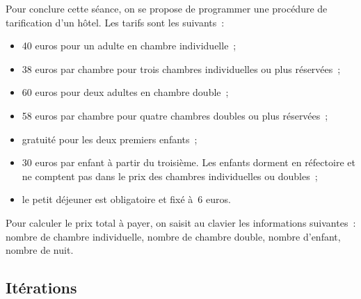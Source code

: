 \begin{exercice}
  Pour   conclure cette  s\'eance, on  se   propose de  programmer une
  proc\'edure   de  tarification  d'un  h\^otel.  Les  tarifs sont les
  suivants~:
  \begin{itemize}
  \item 40 euros pour un adulte en chambre individuelle~;
  \item 38 euros par chambre pour  trois chambres individuelles ou plus
    r\'eserv\'ees~;
  \item 60 euros pour deux adultes en chambre double~;
  \item 58   euros par chambre   pour quatre chambres doubles  ou plus
    r\'eserv\'ees~;
  \item gratuit\'e pour les deux premiers enfants~;
  \item 30 euros par  enfant  \`a partir  du troisi\`eme. Les  enfants
    dorment en  r\'efectoire   et ne  comptent pas dans   le  prix des
    chambres individuelles ou doubles~;
  \item le petit d\'ejeuner est obligatoire et fix\'e \`a~$6$ euros.
  \end{itemize}
  Pour calculer le   prix total \`a payer,  on  saisit au  clavier les
  informations  suivantes~: nombre de  chambre individuelle, nombre de
  chambre double, nombre d'enfant, nombre de nuit.
  \ifcorrection
  \begin{correction}
    
  \end{correction}
  \fi
\end{exercice}
\subsection{It\'erations}
\label{sec:Iterations}
